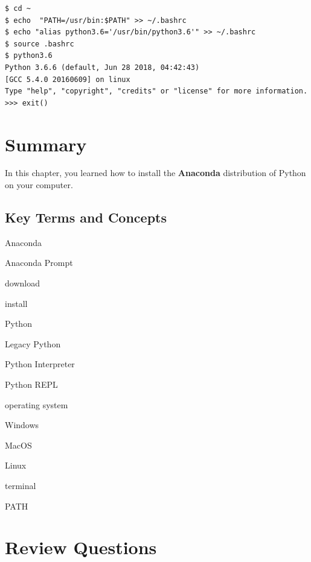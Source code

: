 \documentclass{book}
\newenvironment{key_terms}{\begin{multicols}{3}}{\end{multicols}} %
\begin{document}
\begin{lstlisting}
$ cd ~
$ echo  "PATH=/usr/bin:$PATH" >> ~/.bashrc 
$ echo "alias python3.6='/usr/bin/python3.6'" >> ~/.bashrc
$ source .bashrc
$ python3.6
Python 3.6.6 (default, Jun 28 2018, 04:42:43)
[GCC 5.4.0 20160609] on linux
Type "help", "copyright", "credits" or "license" for more information.
>>> exit()
\end{lstlisting}
    




    
        \newpage
        \section{Summary}\label{summary}

    




    
        In this chapter, you learned how to install the \textbf{Anaconda}
distribution of Python on your computer.
    




    
        \subsection{Key Terms and Concepts}\label{key-terms-and-concepts}
    




    
        \begin{key_terms}
        Anaconda

Anaconda Prompt

download

install

Python

Legacy Python

Python Interpreter

Python REPL

operating system

Windows

MacOS

Linux

terminal

PATH
        \end{key_terms}

    




    
        \section{Review Questions}\label{review-questions}
    
\end{document}
